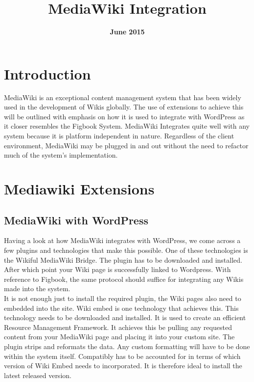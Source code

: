 \documentclass[11pt,a4paper,titlepage]{article}
\begin{document}
\title{ \huge MediaWiki Integration}

\date{\textbf{June 2015}}

\maketitle

\tableofcontents


\pagebreak


\section{Introduction}

MediaWiki is an exceptional content management system that has been widely used in the development of Wikis globally. The use of extensions to achieve this will be outlined with emphasis on how it is used to integrate with WordPress as it closer resembles the Figbook System. MediaWiki Integrates quite well with any system because it is platform independent in nature. Regardless of the client environment, MediaWiki may be plugged in and out without the need to refactor much of the system’s implementation.

\section{Mediawiki Extensions}
\subsection{MediaWiki with WordPress}
Having a look at how MediaWiki integrates with WordPress, we come across a few plugins and technologies that make this possible. One of these technologies is the Wikiful MediaWiki Bridge. The plugin has to be downloaded and installed. After which point your Wiki page is successfully linked to Wordpress. With reference to Figbook, the same protocol should suffice for integrating any Wikis made into the system.\\

It is not enough just to install the required plugin, the Wiki pages also need to embedded into the site. Wiki embed is one technology that achieves this. This technology needs to be downloaded and installed. It is used to create an efficient Resource Management Framework. It achieves this be pulling any requested content from your MediaWiki page and placing it into your custom site. The plugin strips and reformats the data. Any custom formatting will have to be done within the system itself. Compatibly has to be accounted for in terms of which version of Wiki Embed needs to incorporated. It is therefore ideal to install the latest released version.\\
\end{document}
